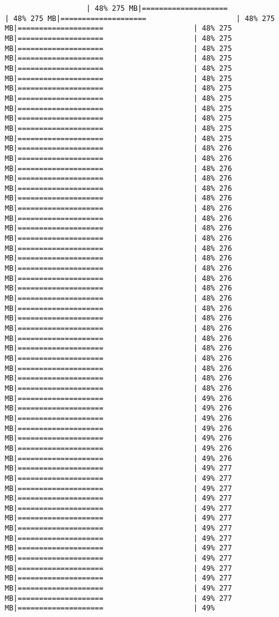 \documentclass[
]{article}
\begin{document}
\begin{verbatim}
                   | 48% 275 MB|====================                     | 48% 275 MB|====================                     | 48% 275 MB|====================                     | 48% 275 MB|====================                     | 48% 275 MB|====================                     | 48% 275 MB|====================                     | 48% 275 MB|====================                     | 48% 275 MB|====================                     | 48% 275 MB|====================                     | 48% 275 MB|====================                     | 48% 275 MB|====================                     | 48% 275 MB|====================                     | 48% 275 MB|====================                     | 48% 275 MB|====================                     | 48% 275 MB|====================                     | 48% 276 MB|====================                     | 48% 276 MB|====================                     | 48% 276 MB|====================                     | 48% 276 MB|====================                     | 48% 276 MB|====================                     | 48% 276 MB|====================                     | 48% 276 MB|====================                     | 48% 276 MB|====================                     | 48% 276 MB|====================                     | 48% 276 MB|====================                     | 48% 276 MB|====================                     | 48% 276 MB|====================                     | 48% 276 MB|====================                     | 48% 276 MB|====================                     | 48% 276 MB|====================                     | 48% 276 MB|====================                     | 48% 276 MB|====================                     | 48% 276 MB|====================                     | 48% 276 MB|====================                     | 48% 276 MB|====================                     | 48% 276 MB|====================                     | 48% 276 MB|====================                     | 48% 276 MB|====================                     | 48% 276 MB|====================                     | 48% 276 MB|====================                     | 49% 276 MB|====================                     | 49% 276 MB|====================                     | 49% 276 MB|====================                     | 49% 276 MB|====================                     | 49% 276 MB|====================                     | 49% 276 MB|====================                     | 49% 276 MB|====================                     | 49% 277 MB|====================                     | 49% 277 MB|====================                     | 49% 277 MB|====================                     | 49% 277 MB|====================                     | 49% 277 MB|====================                     | 49% 277 MB|====================                     | 49% 277 MB|====================                     | 49% 277 MB|====================                     | 49% 277 MB|====================                     | 49% 277 MB|====================                     | 49% 277 MB|====================                     | 49% 277 MB|====================                     | 49% 277 MB|====================                     | 49% 277 MB|====================                     | 49% 
\end{verbatim}
\end{document}
